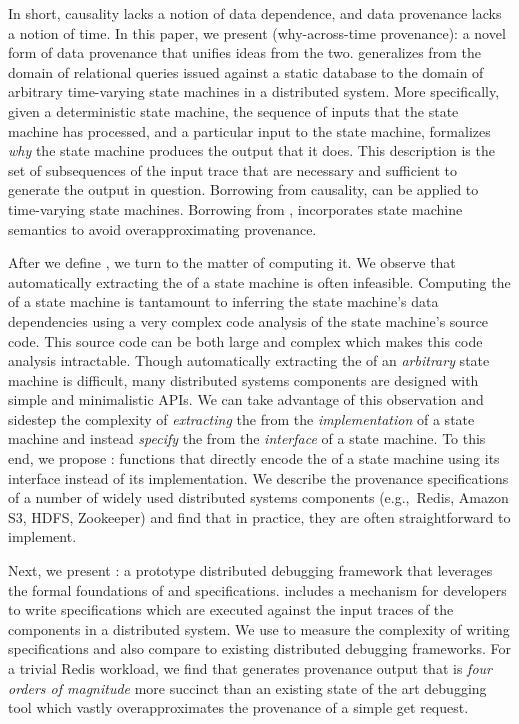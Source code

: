 In short, causality lacks a notion of data dependence, and data provenance
lacks a notion of time. In this paper, we present 
(why-across-time provenance): a novel form of data provenance that unifies
ideas from the two. \Watprovenance{} generalizes \whyprovenance{} from the
domain of relational queries issued against a static database to the domain of
arbitrary time-varying state machines in a distributed system. More
specifically, given a deterministic state machine, the sequence of inputs that
the state machine has processed, and a particular input to the state machine,
\watprovenance{} formalizes \emph{why} the state machine produces the output
that it does. This description is the set of subsequences of the input trace
that are necessary and sufficient to generate the output in question. Borrowing
from causality, \watprovenance{} can be applied to time-varying state machines.
Borrowing from \whyprovenance{}, \watprovenance{} incorporates state machine
semantics to avoid overapproximating provenance.

After we define \watprovenance{}, we turn to the matter of computing it. We
observe that automatically extracting the \watprovenance{} of a state machine
is often infeasible. Computing the \watprovenance{} of a state machine is
tantamount to inferring the state machine's data dependencies using a very
complex code analysis of the state machine's source code. This source code can
be both large and complex which makes this code analysis intractable.
%
Though automatically extracting the \watprovenance{} of an \emph{arbitrary}
state machine is difficult, many distributed systems components are designed
with simple and minimalistic APIs. We can take advantage of this observation
and sidestep the complexity of \emph{extracting} the \watprovenance{} from the
\emph{implementation} of a state machine and instead \emph{specify} the
\watprovenance{} from the \emph{interface} of a state machine. To this end, we
propose : functions that directly
encode the \watprovenance{} of a state machine using its interface instead of
its implementation. We describe the provenance specifications of a number of
widely used distributed systems components (e.g.,\ Redis, Amazon S3, HDFS,
Zookeeper) and find that in practice, they are often straightforward to
implement.

Next, we present \fluent{}: a prototype distributed debugging framework that
leverages the formal foundations of \watprovenance{} and \watprovenance{}
specifications. \fluent{} includes a mechanism for developers to write
\watprovenance{} specifications which are executed against the input traces of
the components in a distributed system. We use \fluent{} to measure the
complexity of writing \watprovenance{} specifications and also compare
\fluent{} to existing distributed debugging frameworks. For a trivial Redis
workload, we find that \fluent{} generates provenance output that is \emph{four
orders of magnitude} more succinct than an existing state of the art debugging
tool which vastly overapproximates the provenance of a simple get request.

